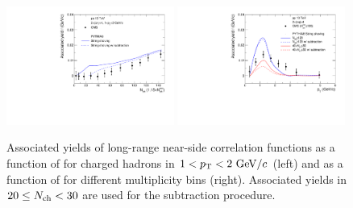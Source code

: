 \begin{figure}[!h]
\includegraphics[width=0.49\textwidth]{figures/cmsmultSub.pdf}
\includegraphics[width=0.49\textwidth]{figures/cmsptSub.pdf}
\caption{Associated yields of long-range near-side correlation functions as a function of \Nch for charged hadrons in $1<\mbox{$p_{\mathrm{T}}$}<2~\mathrm{GeV}/c$ (left) and as a function of \pt for different multiplicity bins (right). Associated yields in $20\leq\mbox{$N_\mathrm{ch}$}< 30$ are used for the subtraction procedure.}\label{fig:aysub}
\end{figure}

